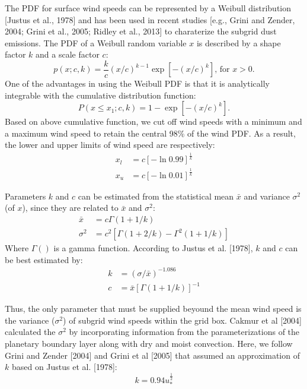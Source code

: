   The PDF for surface wind speeds can be represented by a Weibull distribution 
  [Justus et al., 1978] and has been used in recent studies [e.g., Grini and Zender,
  2004; Grini et al., 2005; Ridley et al., 2013] to charaterize the subgrid dust 
  emissions. The PDF of a Weibull random variable $x$ is described by a shape factor $k$ 
  and a scale factor $c$:
  \begin{equation}
  p(x;c,k) = \frac{k}{c} (x/c )^{k-1}
         \exp{\left[ -(x/c)^k \right]} \mbox{,  for } x>0 \mbox{.} 
  \end{equation}
  One of the advantages in using the Weibull PDF is that it is analytically 
  integrable with the cumulative distribution function:
  \begin{equation}
  P(x \leq x_1;c,k) = 1 - \exp{ \left[ -(x/c)^k\right] } \mbox{.}
  \end{equation} 
  Based on above cumulative function, we cut off wind speeds with a minimum and a 
  maximum wind speed to retain the central 98\% of the wind PDF. As a result, the 
  lower and upper limits of wind speed are respectively:
  \begin{align} 
  x_{l} &= c \left[ -\ln{0.99} \right]^{\frac{1}{k}}  \\
  x_{u} &= c \left[ -\ln{0.01} \right]^{\frac{1}{k}} \label{eq:xu}
  \end{align}

  Parameters $k$ and $c$ can be estimated from the statistical mean $\bar{x}$ and 
  variance $\sigma^2$ (of $x$), since they are related to $\bar{x}$ and $\sigma^2$: 
  \begin{align}
  \bar{x}  &= c \Gamma(1+1/k)  \\
  \sigma^2 &= c^2 \left[ \Gamma(1+2/k) - \Gamma^2(1+1/k) \right]  
  \end{align}
  Where $\Gamma()$ is a gamma function. According to Justus et al. [1978], $k$ and $c$ 
  can be best estimated by:
  \begin{align}
  k &= (\sigma/\bar{x})^{-1.086} \\
  c &= \bar{x} \left[ \Gamma(1+1/k) \right]^{-1}
  \end{align}
  
  Thus, the only parameter that must be supplied beyound the mean wind speed is the 
  variance ($\sigma^2$) of subgrid wind speeds within the grid box. Cakmur et al [2004] 
  calculated the $\sigma^2$ by incorporating information from the parameterizations of 
  the planetary boundary layer along with dry and moist convection. Here, we follow 
  Grini and Zender [2004] and Grini et al [2005] that assumed an approximation of $k$ 
  based on Justus et al. [1978]:
  \begin{equation}
  k = 0.94u_*^{\frac{1}{2}}
  \end{equation}

